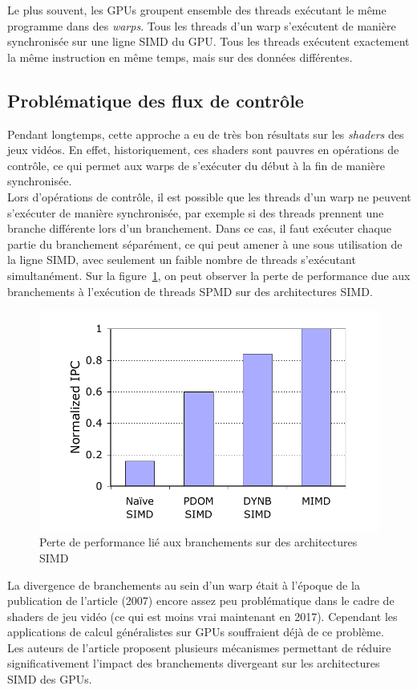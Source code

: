 \documentclass[11pt]{article}
\begin{document}
Le plus souvent, les GPUs groupent ensemble des threads exécutant le même programme dans des \emph{warps}. Tous les threads d'un warp s'exécutent de manière synchronisée sur une ligne SIMD du GPU.
Tous les threads exécutent exactement la même instruction en même temps, mais sur des données différentes.

\subsection{Problématique des flux de contrôle}

Pendant longtemps, cette approche a eu de très bon résultats sur les \emph{shaders} des jeux vidéos. En effet, historiquement, ces shaders sont pauvres en opérations de contrôle, ce qui permet aux warps de s'exécuter du début à la fin de manière synchronisée.
\\Lors d'opérations de contrôle, il est possible que les threads d'un warp ne peuvent s'exécuter de manière synchronisée, par exemple si des threads prennent une branche différente lors d'un branchement.
Dans ce cas, il faut exécuter chaque partie du branchement séparément, ce qui peut amener à une sous utilisation de la ligne SIMD, avec seulement un faible nombre de threads s'exécutant simultanément.
Sur la figure~\ref{IPC}, on peut observer la perte de performance due aux branchements à l'exécution de threads SPMD sur des architectures SIMD.

\begin{figure}[h]
   \caption{\label{IPC} Perte de performance lié aux branchements sur des architectures SIMD}
   \includegraphics[scale=.6]{ipc}
\end{figure}

La divergence de branchements au sein d'un warp était à l'époque de la publication de l'article (2007) encore assez peu problématique dans le cadre de shaders de jeu vidéo (ce qui est moins vrai maintenant en 2017). Cependant les applications de calcul généralistes sur GPUs souffraient déjà de ce problème.
\\Les auteurs de l'article proposent plusieurs mécanismes permettant de réduire significativement l'impact des branchements divergeant sur les architectures SIMD des GPUs.
\end{document}
